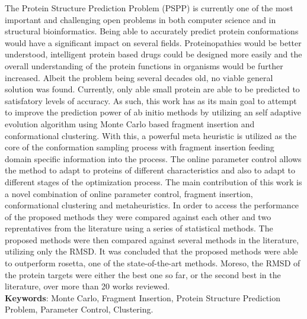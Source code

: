 \begin{resumo}
  The Protein Structure Prediction Problem (PSPP) is currently one of the
  most important and challenging open problems in both computer science and
  in structural bioinformatics. Being able to accurately predict protein
  conformations would have a significant impact on several fields.
  Proteinopathies would be better understood, intelligent protein based drugs
  could be designed more easily and the overall understanding of the protein
  functions in organisms would be further increased. Albeit the problem being
  several decades old, no viable general solution was found. Currently, only
  able small protein are able to be predicted to satisfatory levels of
  accuracy. As such, this work has as its main goal to attempt to improve the
  prediction power of ab initio methods by utilizing an self adaptive
  evolution algorithm using Monte Carlo based fragment insertion and
  conformational clustering. With this, a powerful meta heuristic is utilized
  as the core of the conformation sampling process with fragment insertion
  feeding domain specific information into the process. The online parameter
  control allows the method to adapt to proteins of different characteristics
  and also to adapt to different stages of the optimization process. The main
  contribution of this work is a novel combination of online parameter
  control, fragment insertion, conformational clustering and metaheuristics.
  In order to access the performance of the proposed methods they were
  compared against each other and two reprentatives from the literature using
  a series of statistical methods. The proposed methods were then compared
  against several methods in the literature, utilizing only the RMSD. It was
  concluded that the proposed methods were able to outperform rosetta, one of
  the state-of-the-art methods. Moreso, the RMSD of the protein targets were
  either the best one so far, or the second best in the literature, over more
  than 20 works reviewed.
  \\
  \vspace{\onelineskip}
  \noindent
  \textbf{Keywords}: Monte Carlo, Fragment Insertion, Protein Structure Prediction Problem, Parameter Control, Clustering.
\end{resumo}



